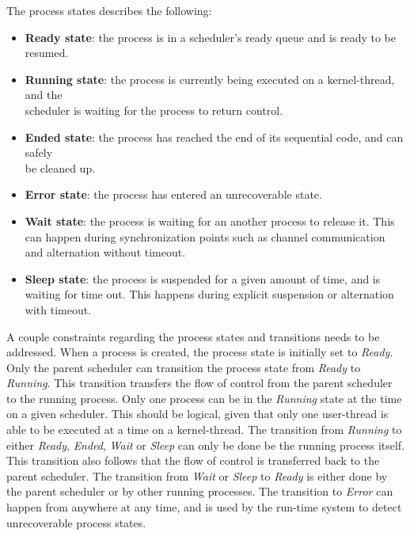 \FloatBarrier

The process states describes the following: 
\begin{itemize}
    \setlength\itemsep{0em}
    \item \textbf{Ready state}: the process is in a scheduler's ready queue and is ready to be resumed. 
    \item \textbf{Running state}: the process is currently being executed on a kernel\hyp{}thread, and the\\ scheduler is waiting for the process to return control.
    \item \textbf{Ended state}: the process has reached the end of its sequential code, and can safely\\ be cleaned up.
    \item \textbf{Error state}: the process has entered an unrecoverable state.
    \item \textbf{Wait state}: the process is waiting for an another process to release it. This can happen during synchronization points such as channel communication and alternation without timeout.
    \item \textbf{Sleep state}: the process is suspended for a given amount of time, and is waiting for time out. This happens during explicit suspension or alternation with timeout.  
\end{itemize}

A couple constraints regarding the process states and transitions needs to be addressed. When a process is created, the process state is initially set to \textit{Ready}. Only the parent scheduler can transition the process state from \textit{Ready} to \textit{Running}. This transition transfers the flow of control from the parent scheduler to the running process. Only one process can be in the \textit{Running} state at the time on a given scheduler. This should be logical, given that only one user\hyp{}thread is able to be executed at a time on a kernel\hyp{}thread. The transition from \textit{Running} to either \textit{Ready}, \textit{Ended}, \textit{Wait} or \textit{Sleep} can only be done be the running process itself. This transition also follows that the flow of control is transferred back to the parent scheduler. The transition from \textit{Wait} or \textit{Sleep} to \textit{Ready} is either done by the parent scheduler or by other running processes. The transition to \textit{Error} can happen from anywhere at any time, and is used by the run\hyp{}time system to detect unrecoverable process states.


